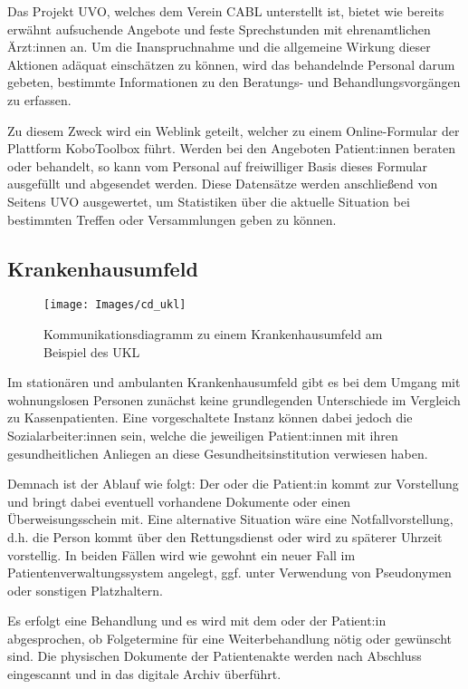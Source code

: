 Das Projekt \ac{UVO}, welches dem Verein \ac{CABL} unterstellt ist, bietet wie bereits erwähnt aufsuchende Angebote und feste Sprechstunden mit ehrenamtlichen Ärzt:innen an. Um die Inanspruchnahme und die allgemeine Wirkung dieser Aktionen adäquat einschätzen zu können, wird das behandelnde Personal darum gebeten, bestimmte Informationen zu den Beratungs- und Behandlungsvorgängen zu erfassen.

Zu diesem Zweck wird ein Weblink geteilt, welcher zu einem Online-Formular der Plattform KoboToolbox führt. Werden bei den Angeboten Patient:innen beraten oder behandelt, so kann vom Personal auf freiwilliger Basis dieses Formular ausgefüllt und abgesendet werden. Diese Datensätze werden anschließend von Seitens \ac{UVO} ausgewertet, um Statistiken über die aktuelle Situation bei bestimmten Treffen oder Versammlungen geben zu können.

\subsection{Krankenhausumfeld}\label{sub:ukl}

\begin{figure}[h]
	\centering
	\texttt{[image: Images/cd\_ukl]}
	\caption[Kommunikationsdiagramm UKL]{Kommunikationsdiagramm zu einem Krankenhausumfeld am Beispiel des UKL}
	\label{fig:cdUKL}
\end{figure}

Im stationären und ambulanten Krankenhausumfeld gibt es bei dem Umgang mit wohnungslosen Personen zunächst keine grundlegenden Unterschiede im Vergleich zu Kassenpatienten. Eine vorgeschaltete Instanz können dabei jedoch die Sozialarbeiter:innen sein, welche die jeweiligen Patient:innen mit ihren gesundheitlichen Anliegen an diese Gesundheitsinstitution verwiesen haben.

Demnach ist der Ablauf wie folgt: Der oder die Patient:in kommt zur Vorstellung und bringt dabei eventuell vorhandene Dokumente oder einen Überweisungsschein mit. Eine alternative Situation wäre eine Notfallvorstellung, d.h. die Person kommt über den Rettungsdienst oder wird zu späterer Uhrzeit vorstellig. In beiden Fällen wird wie gewohnt ein neuer Fall im Patientenverwaltungssystem angelegt, ggf. unter Verwendung von Pseudonymen oder sonstigen Platzhaltern.

Es erfolgt eine Behandlung und es wird mit dem oder der Patient:in abgesprochen, ob Folgetermine für eine Weiterbehandlung nötig oder gewünscht sind. Die physischen Dokumente der Patientenakte werden nach Abschluss eingescannt und in das digitale Archiv überführt. 

